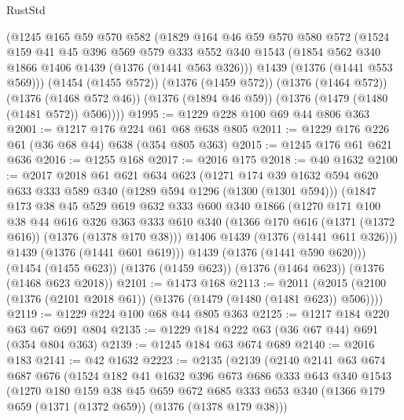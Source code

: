 \begin{lexlean}{RustStd}
\begin{coremodule}
    (@1245
      @165
      @59
      @570
      @582
      (@1829
        @164
        @46
        @59
        @570
        @580
        @572
        (@1524
          @159
          @41
          @45
          @396
          @569
          @579
          @333
          @552
          @340
          @1543
          (@1854 @562 @340 @1866 @1406 @1439 (@1376 (@1441 @563 @326)))
          @1439
          (@1376 (@1441 @553 @569)))
        (@1454 (@1455 @572))
        (@1376 (@1459 @572))
        (@1376 (@1464 @572))
        (@1376 (@1468 @572 @46))
        (@1376 (@1894 @46 @59))
        (@1376 (@1479 (@1480 (@1481 @572)) @506))))
@1995 := @1229 @228 @100 @69 @44 @806 @363
@2001 := @1217 @176 @224 @61 @68 @638 @805
@2011 := @1229 @176 @226 @61 (@36 @68 @44) @638 (@354 @805 @363)
@2015 := @1245 @176 @61 @621 @636
@2016 := @1255 @168
@2017 := @2016 @175
@2018 := @40 @1632
@2100 := @2017
    @2018
    @61
    @621
    @634
    @623
    (@1271
      @174
      @39
      @1632
      @594
      @620
      @633
      @333
      @589
      @340
      (@1289 @594 @1296 (@1300 (@1301 @594)))
      (@1847
        @173
        @38
        @45
        @529
        @619
        @632
        @333
        @600
        @340
        @1866
        (@1270
          @171
          @100
          @38
          @44
          @616
          @326
          @363
          @333
          @610
          @340
          (@1366 @170 @616 (@1371 (@1372 @616)) (@1376 (@1378 @170 @38)))
          @1406
          @1439
          (@1376 (@1441 @611 @326)))
        @1439
        (@1376 (@1441 @601 @619)))
      @1439
      (@1376 (@1441 @590 @620)))
    (@1454 (@1455 @623))
    (@1376 (@1459 @623))
    (@1376 (@1464 @623))
    (@1376 (@1468 @623 @2018))
@2101 := @1473 @168
@2113 := @2011 (@2015 (@2100 (@1376 (@2101 @2018 @61)) (@1376 (@1479 (@1480 (@1481 @623)) @506))))
@2119 := @1229 @224 @100 @68 @44 @805 @363
@2125 := @1217 @184 @220 @63 @67 @691 @804
@2135 := @1229 @184 @222 @63 (@36 @67 @44) @691 (@354 @804 @363)
@2139 := @1245 @184 @63 @674 @689
@2140 := @2016 @183
@2141 := @42 @1632
@2223 := @2135
    (@2139
      (@2140
        @2141
        @63
        @674
        @687
        @676
        (@1524
          @182
          @41
          @1632
          @396
          @673
          @686
          @333
          @643
          @340
          @1543
          (@1270
            @180
            @159
            @38
            @45
            @659
            @672
            @685
            @333
            @653
            @340
            (@1366 @179 @659 (@1371 (@1372 @659)) (@1376 (@1378 @179 @38)))

\end{coremodule}
\end{lexlean}
